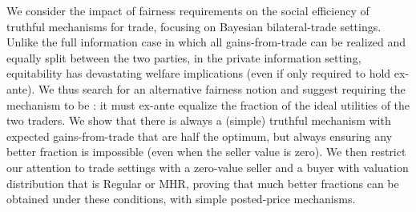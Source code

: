
We consider the impact of fairness requirements on the social efficiency of truthful mechanisms for trade, focusing on Bayesian bilateral-trade settings. 
Unlike the full information case in which all gains-from-trade can be realized and equally split between the two parties, in the private information setting, equitability has devastating welfare implications (even if only required to hold ex-ante). 
We thus search for an alternative fairness notion and suggest requiring the mechanism to be {\ksfair}: it must ex-ante equalize the fraction of the ideal utilities of the two traders.  
We show that there is always a {\ksfair} (simple) truthful mechanism with expected gains-from-trade that are half the optimum, but always ensuring any better fraction is impossible (even when the seller value is zero). 
We then restrict our attention to trade settings with a zero-value seller and a buyer with valuation distribution that is Regular or MHR, proving that much better fractions can be obtained under these conditions, with simple posted-price mechanisms. 